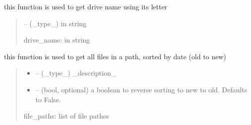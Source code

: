 \documentclass[letterpaper,10pt,english]{sphinxmanual}
\begin{document}

\begin{savenotes}\begin{fulllineitems}
\label{\detokenize{setting/backend/storage_funcs:oxin.backend.storage_funcs.get_drivename}}
\pysigstartsignatures
{}
\pysigstopsignatures
\sphinxAtStartPar
this function is used to get drive name using its letter
\begin{quote}\begin{description}
\sphinxAtStartPar
{} – (\_type\_) in string

\sphinxAtStartPar
drive\_name: in string

\end{description}\end{quote}

\end{fulllineitems}\end{savenotes}


\begin{savenotes}\begin{fulllineitems}
\label{\detokenize{setting/backend/storage_funcs:oxin.backend.storage_funcs.get_files_in_path}}
\pysigstartsignatures
{}
\pysigstopsignatures
\sphinxAtStartPar
this function is used to get all files in a path, sorted by date (old to new)
\begin{quote}\begin{description}
\begin{itemize}
\item {} 
\sphinxAtStartPar
{} – (\_type\_) \_description\_

\item {} 
\sphinxAtStartPar
{} – (bool, optional) a boolean to reverse sorting to new to old. Defaults to False.

\end{itemize}

\sphinxAtStartPar
file\_paths: list of file pathes

\end{description}\end{quote}

\end{fulllineitems}\end{savenotes}
\end{document}
